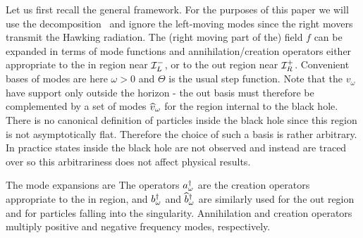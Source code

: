 Let us first recall the general framework.  For the purposes of this paper we
will use the decomposition \classm\
and ignore the left-moving modes since the right movers transmit the
Hawking radiation.
The (right moving part of the)
field $f$ can be expanded in terms of mode functions and annihilation/creation
operators either appropriate to the in region near ${\cal I}_L^-$, or to
the out
region near ${\cal I}_R^+$.
Convenient bases of modes are
%
\eqn{}
%
here $\omega>0$ and $\Theta$ is the usual step function.
Note that the $v_{\omega}$ have support only outside the horizon - the
out basis must therefore be complemented by a set of modes
${\widehat v}_\omega$ for the region internal to the black hole.
There is no canonical definition of particles inside the black hole since
this region is not asymptotically flat.  Therefore the
choice of such a basis is rather arbitrary.  In practice
states
inside the black hole are not observed and instead are traced over
so this arbitrariness does not affect physical results.

The mode expansions are
%
\eqn{}
%
The operators $a_\omega^\dagger$ are the creation operators appropriate to the in
region, and $b_\omega^\dagger$ and
${\widehat b}_\omega^\dagger$ are similarly used for the out region and for particles
falling into the singularity.
Annihilation and creation operators multiply positive and negative
frequency modes, respectively.

